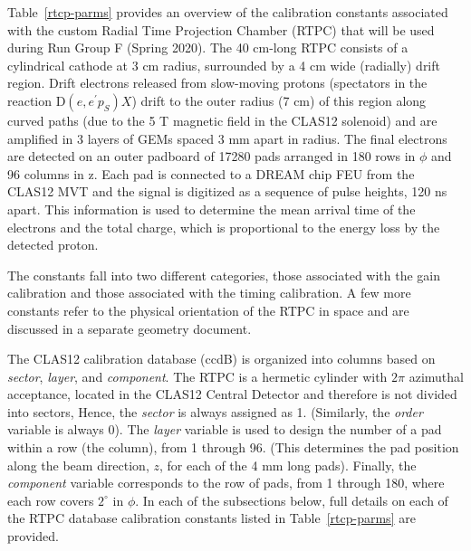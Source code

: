 \documentclass[12pt]{article}
\begin{document}
Table~\ref{rtcp-parms} provides an overview of the calibration constants associated 
with the custom Radial Time Projection Chamber (RTPC) that will be used during Run Group F
(Spring 2020). The 40 cm-long RTPC consists of a cylindrical cathode at 3 cm radius, surrounded by a 4 cm 
wide (radially) drift region. Drift electrons released from slow-moving protons (spectators in the reaction 
D$(e,e^\prime p_S)X$) drift to the outer radius (7 cm) of this region along curved paths (due to the 5 T
magnetic field in the CLAS12 solenoid) and are amplified in 3 layers of GEMs spaced 3 mm apart in radius. 
The final electrons are detected on an outer padboard of 17280 pads arranged in 180 rows in $\phi$ and
96 columns in z. Each pad is connected to a DREAM chip FEU from the CLAS12 MVT and the signal is
digitized as a sequence of pulse heights, 120 ns apart. This information is used to determine the mean arrival
time of the electrons and the total charge, which is proportional to the energy loss by the detected proton.

The constants fall into two 
different categories, those associated with the gain calibration 
and those associated with the timing calibration. A few more constants refer to the physical orientation 
of the RTPC in space and are discussed in a separate geometry document.

The CLAS12 calibration database (ccdB) is organized into columns based on {\it sector}, 
{\it layer}, and {\it component}. The RTPC is a hermetic cylinder with $2 \pi$ azimuthal
acceptance, located in the CLAS12 Central Detector and therefore is not
divided into sectors, Hence, the {\it sector} is always assigned as 1. (Similarly, the {\it order} 
variable is always 0).
The {\it layer} variable is used to design the number of a pad within a row (the column), from 1 through 96.
(This determines the pad position along the beam direction, $z$, for each of the 4 mm long pads).
Finally, the {\it component} variable
corresponds to the row of pads, from 1 through 180, where each row covers $2^\circ$ in $\phi$.
In each of the subsections below, full details on each of the RTPC database calibration
constants listed in Table~\ref{rtcp-parms} are provided.    
\end{document}
